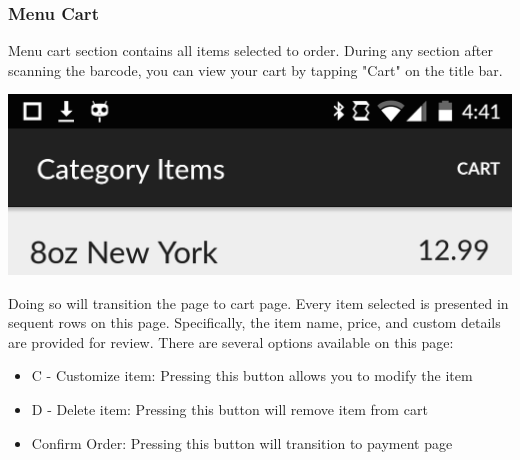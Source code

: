 \documentclass[12pt, titlepage]{article}
\begin{document}
\subsubsection{Menu Cart}

Menu cart section contains all items selected to order. During any section after scanning the barcode, you can view your cart by tapping "Cart" on the title bar.
\begin{center}\includegraphics[scale=0.15]{titlebar.png}\end{center}

\noindent Doing so will transition the page to cart page. Every item selected is presented in sequent rows on this page. Specifically, the item name, price, and custom details are provided for review. There are several options available on this page:

\begin{itemize}
  \item C - Customize item: Pressing this button allows  you to modify the item
  \item D - Delete item: Pressing this button will remove item from cart
  \item Confirm Order: Pressing this button will transition to payment page
\end{itemize}
\end{document}
